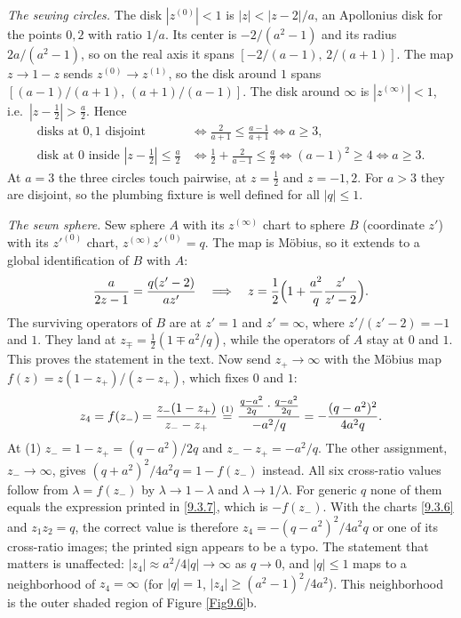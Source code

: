 \begin{tcolorbox}[breakable]
	\begin{remark}
		\emph{The sewing circles.} The disk $|z^{(0)}|<1$ is $|z|<|z-2|/a$, an Apollonius disk for the points $0,2$ with ratio $1/a$. Its center is $-2/(a^2-1)$ and its radius $2a/(a^2-1)$, so on the real axis it spans $[-2/(a-1),\,2/(a+1)]$. The map $z\to1-z$ sends $z^{(0)}\to z^{(1)}$, so the disk around $1$ spans $[(a-1)/(a+1),\,(a+1)/(a-1)]$. The disk around $\infty$ is $|z^{(\infty)}|<1$, i.e.\ $|z-\frac12|>\frac a2$. Hence
		\begin{align*}
			\text{disks at }0,1\text{ disjoint}&\iff\frac{2}{a+1}\le\frac{a-1}{a+1}\iff a\ge3,\\
			\text{disk at }0\text{ inside }|z-\tfrac12|\le\tfrac a2&\iff\frac12+\frac{2}{a-1}\le\frac a2\iff(a-1)^2\ge4\iff a\ge3 .
		\end{align*}
		At $a=3$ the three circles touch pairwise, at $z=\frac12$ and $z=-1,2$. For $a>3$ they are disjoint, so the plumbing fixture is well defined for all $|q|\le1$.

		\emph{The sewn sphere.} Sew sphere $A$ with its $z^{(\infty)}$ chart to sphere $B$ (coordinate $z'$) with its $z'^{(0)}$ chart, $z^{(\infty)}z'^{(0)}=q$. The map is M\"obius, so it extends to a global identification of $B$ with $A$:
		\begin{equation*}
			\frac{a}{2z-1}=\frac{q(z'-2)}{az'}\quad\Longrightarrow\quad z=\frac12\Bigl(1+\frac{a^2}{q}\frac{z'}{z'-2}\Bigr).
		\end{equation*}
		The surviving operators of $B$ are at $z'=1$ and $z'=\infty$, where $z'/(z'-2)=-1$ and $1$. They land at $z_\mp=\frac12(1\mp a^2/q)$, while the operators of $A$ stay at $0$ and $1$. This proves the statement in the text. Now send $z_+\to\infty$ with the M\"obius map $f(z)=z(1-z_+)/(z-z_+)$, which fixes $0$ and $1$:
		\begin{equation*}
			z_4=f(z_-)=\frac{z_-(1-z_+)}{z_--z_+}\overset{(1)}{=}\frac{\frac{q-a^2}{2q}\cdot\frac{q-a^2}{2q}}{-a^2/q}=-\frac{(q-a^2)^2}{4a^2q} .
		\end{equation*}
		At (1) $z_-=1-z_+=(q-a^2)/2q$ and $z_--z_+=-a^2/q$. The other assignment, $z_-\to\infty$, gives $(q+a^2)^2/4a^2q=1-f(z_-)$ instead. All six cross-ratio values follow from $\lambda=f(z_-)$ by $\lambda\to1-\lambda$ and $\lambda\to1/\lambda$. For generic $q$ none of them equals the expression printed in \eqref{9.3.7}, which is $-f(z_-)$. With the charts \eqref{9.3.6} and $z_1z_2=q$, the correct value is therefore $z_4=-(q-a^2)^2/4a^2q$ or one of its cross-ratio images; the printed sign appears to be a typo. The statement that matters is unaffected: $|z_4|\approx a^2/4|q|\to\infty$ as $q\to0$, and $|q|\le1$ maps to a neighborhood of $z_4=\infty$ (for $|q|=1$, $|z_4|\ge(a^2-1)^2/4a^2$). This neighborhood is the outer shaded region of Figure \ref{Fig9.6}b.
	\end{remark}
\end{tcolorbox}
